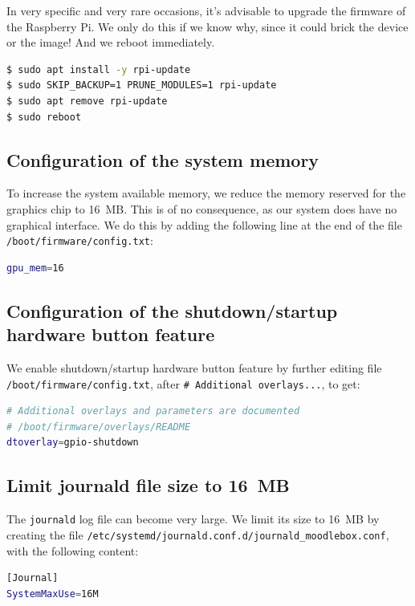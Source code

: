 \documentclass[12pt]{article}
\begin{document}
In very specific and very rare occasions, it's advisable to upgrade the firmware of the Raspberry Pi.
We only do this if we know why, since it could brick the device or the image!
And we reboot immediately.

\begin{lstlisting}[language=bash]
$ sudo apt install -y rpi-update
$ sudo SKIP_BACKUP=1 PRUNE_MODULES=1 rpi-update
$ sudo apt remove rpi-update
$ sudo reboot
\end{lstlisting}
\fi

\subsection{Configuration of the system memory}

To increase the system available memory, we reduce the memory reserved for the graphics chip to 16~MB.
This is of no consequence, as our system does have no graphical interface.
We do this by adding the following line at the end of the file \lstinline{/boot/firmware/config.txt}:
\begin{lstlisting}[language=bash]
gpu_mem=16
\end{lstlisting}

\subsection{Configuration of the shutdown/startup hardware button feature}

We enable shutdown/startup hardware button feature by further editing file \lstinline{/boot/firmware/config.txt}, after \lstinline{# Additional overlays...}, to get:
\begin{lstlisting}[language=bash]
# Additional overlays and parameters are documented
# /boot/firmware/overlays/README
dtoverlay=gpio-shutdown
\end{lstlisting}

\subsection{Limit journald file size to 16~MB}

The \lstinline{journald} log file can become very large.
We limit its size to 16~MB by creating the file \lstinline{/etc/systemd/journald.conf.d/journald_moodlebox.conf}, with the following content:\begin{lstlisting}[language=bash]
[Journal]
SystemMaxUse=16M
\end{lstlisting}
\end{document}

